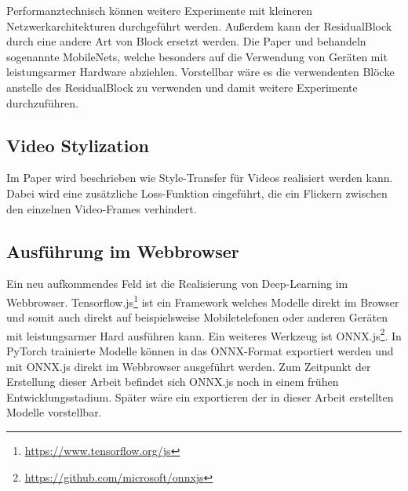 Performanztechnisch können weitere Experimente mit kleineren Netzwerkarchitekturen durchgeführt werden. Außerdem kann der ResidualBlock durch eine andere Art von Block ersetzt werden. Die Paper \cite{DBLP:journals/corr/HowardZCKWWAA17} und \cite{DBLP:journals/corr/abs-1801-04381} behandeln sogenannte MobileNets, welche besonders auf die Verwendung von Geräten mit leistungsarmer Hardware abziehlen. Vorstellbar wäre es die verwendenten Blöcke anstelle des ResidualBlock zu verwenden und damit weitere Experimente durchzuführen.

\subsection{Video Stylization}
\label{sec:video_stylization}

Im Paper \cite{DBLP:journals/corr/abs-1807-01197} wird beschrieben wie Style-Transfer für Videos realisiert werden kann. Dabei wird eine zusätzliche Loss-Funktion eingeführt, die ein Flickern zwischen den einzelnen Video-Frames verhindert.

\subsection{Ausführung im Webbrowser}
\label{sec:inference_in_browser}


Ein neu aufkommendes Feld ist die Realisierung von Deep-Learning im Webbrowser. Tensorflow.js\footnote{\url{https://www.tensorflow.org/js}} ist ein Framework welches Modelle direkt im Browser und somit auch direkt auf beispielsweise Mobiletelefonen oder anderen Geräten mit leistungsarmer Hard ausführen kann. Ein weiteres Werkzeug ist ONNX.js\footnote{\url{https://github.com/microsoft/onnxjs}}. In PyTorch trainierte Modelle können in das ONNX-Format exportiert werden und mit ONNX.js direkt im Webbrowser ausgeführt werden. Zum Zeitpunkt der Erstellung dieser Arbeit befindet sich ONNX.js noch in einem frühen Entwicklungsstadium. Später wäre ein exportieren der in dieser Arbeit erstellten Modelle vorstellbar.